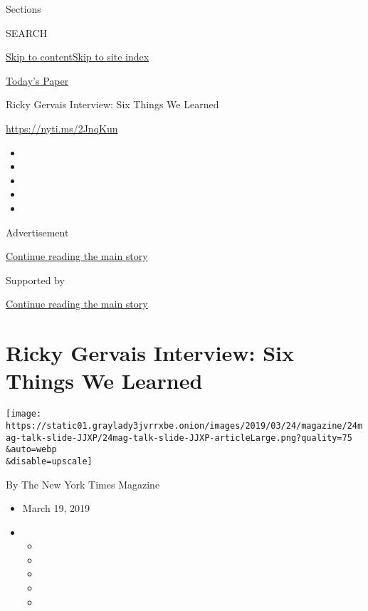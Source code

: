 Sections

SEARCH

\protect\hyperlink{site-content}{Skip to
content}\protect\hyperlink{site-index}{Skip to site index}

\href{https://myaccount.nytimes3xbfgragh.onion/auth/login?response_type=cookie\&client_id=vi}{}

\href{https://www.nytimes3xbfgragh.onion/section/todayspaper}{Today's
Paper}

Ricky Gervais Interview: Six Things We Learned

\url{https://nyti.ms/2JnqKun}

\begin{itemize}
\item
\item
\item
\item
\item
\end{itemize}

Advertisement

\protect\hyperlink{after-top}{Continue reading the main story}

Supported by

\protect\hyperlink{after-sponsor}{Continue reading the main story}

\hypertarget{ricky-gervais-interview-six-things-we-learned}{%
\section{Ricky Gervais Interview: Six Things We
Learned}\label{ricky-gervais-interview-six-things-we-learned}}

\texttt{[image: https://static01.graylady3jvrrxbe.onion/images/2019/03/24/magazine/24mag-talk-slide-JJXP/24mag-talk-slide-JJXP-articleLarge.png?quality=75\\\&auto=webp\\\&disable=upscale]}

By The New York Times Magazine

\begin{itemize}
\item
  March 19, 2019
\item
  \begin{itemize}
  \item
  \item
  \item
  \item
  \item
  \end{itemize}
\end{itemize}


